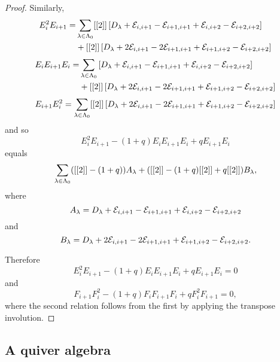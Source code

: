 \documentclass[a4paper, 11pt, twoside]{report}
\begin{document}
\begin{proof}
Similarly,
\begin{align*}
E_i^2E_{i+1} = &\sum_{\lambda\in\Lambda_0{}} [[2]]\left[D_{\lambda} +\mathcal{E}_{i,i+1} -\mathcal{E}_{i+1,i+1} +\mathcal{E}_{i,i+2} -\mathcal{E}_{i+2,i+2}\right]\\
&+[[2]]\left[D_{\lambda} +2\mathcal{E}_{i,i+1} -2\mathcal{E}_{i+1,i+1} +\mathcal{E}_{i+1,i+2} - \mathcal{E}_{i+2,i+2}\right]
\end{align*}
\begin{align*}
E_i E_{i+1} E_i = &\sum_{\lambda\in\Lambda_0{}} \left[D_{\lambda} +\mathcal{E}_{i,i+1} -\mathcal{E}_{i+1,i+1} +\mathcal{E}_{i,i+2} -\mathcal{E}_{i+2,i+2}\right]\\
&+[[2]]\left[D_{\lambda} +2\mathcal{E}_{i,i+1} -2\mathcal{E}_{i+1,i+1} +\mathcal{E}_{i+1,i+2} -\mathcal{E}_{i+2,i+2}\right]
\end{align*}
\begin{equation*}
E_{i+1}E_i^2 = \sum_{\lambda\in\Lambda_0{}} [[2]]\left[D_{\lambda} +2\mathcal{E}_{i,i+1} -2\mathcal{E}_{i+1,i+1} +\mathcal{E}_{i+1,i+2} -\mathcal{E}_{i+2,i+2}\right]
\end{equation*}
and so
\begin{equation*}
E_i^2E_{i+1} -(1+q)E_iE_{i+1}E_i +qE_{i+1}E_i
\end{equation*}
equals
\begin{equation*}
\sum_{\lambda\in\Lambda_0{}} ([[2]] -(1+q))A_\lambda + ([[2]] -(1+q)[[2]] +q[[2]])B_\lambda,
\end{equation*}
where
\begin{equation*}
A_\lambda = D_{\lambda} +\mathcal{E}_{i,i+1} -\mathcal{E}_{i+1,i+1} +\mathcal{E}_{i,i+2} -\mathcal{E}_{i+2,i+2}
\end{equation*}
and
\begin{equation*}
B_\lambda = D_{\lambda} +2\mathcal{E}_{i,i+1} -2\mathcal{E}_{i+1,i+1} +\mathcal{E}_{i+1,i+2} -\mathcal{E}_{i+2,i+2}.
\end{equation*}

Therefore
\begin{equation*}
E_i^2E_{i+1} -(1+q)E_iE_{i+1}E_i +qE_{i+1}E_i = 0
\end{equation*}
and
\begin{equation*}
F_{i+1}F_i^2 -(1+q)F_iF_{i+1}F_i +qF_i^2F_{i+1} = 0,
\end{equation*}
where the second relation follows from the first by applying the transpose involution.
\end{proof}


\subsection{A quiver algebra}\label{section:q-quiver}
\end{document}
